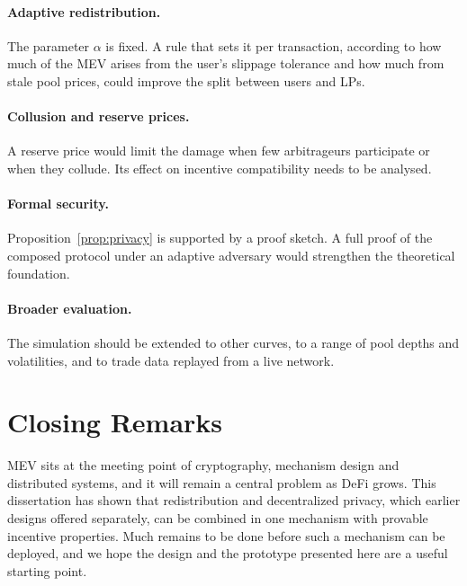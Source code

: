 \paragraph{Adaptive redistribution.} The parameter $\alpha$ is fixed. A rule that sets it per transaction, according to how much of the MEV arises from the user's slippage tolerance and how much from stale pool prices, could improve the split between users and LPs.

\paragraph{Collusion and reserve prices.} A reserve price would limit the damage when few arbitrageurs participate or when they collude. Its effect on incentive compatibility needs to be analysed.

\paragraph{Formal security.} Proposition~\ref{prop:privacy} is supported by a proof sketch. A full proof of the composed protocol under an adaptive adversary would strengthen the theoretical foundation.

\paragraph{Broader evaluation.} The simulation should be extended to other curves, to a range of pool depths and volatilities, and to trade data replayed from a live network.

\section{Closing Remarks}

MEV sits at the meeting point of cryptography, mechanism design and distributed systems, and it will remain a central problem as DeFi grows. This dissertation has shown that redistribution and decentralized privacy, which earlier designs offered separately, can be combined in one mechanism with provable incentive properties. Much remains to be done before such a mechanism can be deployed, and we hope the design and the prototype presented here are a useful starting point.
